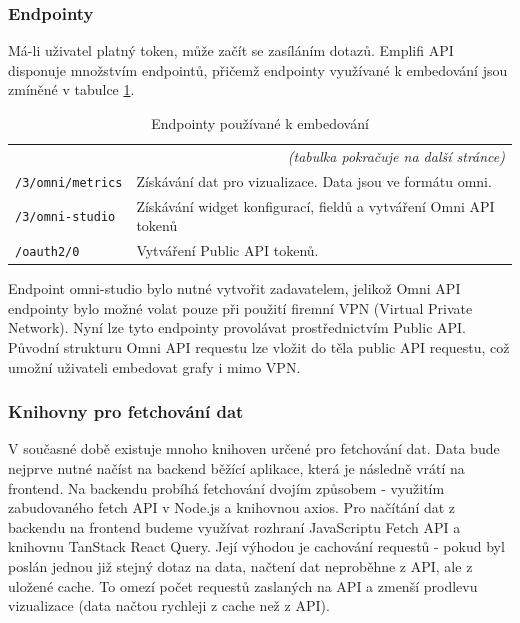 \documentclass[czech, bc, kiv, he, iso690numb]{fasthesis}
\begin{document}
\subsubsection{Endpointy}

Má-li uživatel platný token, může začít se zasíláním dotazů. Emplifi API disponuje množstvím endpointů, přičemž endpointy využívané k embedování jsou zmíněné v tabulce \ref{tab:embeddingEndpoints}. 

\begin{center}
	\begin{longtable}{p{}p{}}
	\caption{Endpointy používané k embedování}
	\label{tab:embeddingEndpoints}\\
	\toprule[1.5pt]
	\endhead
	\midrule
	\multicolumn{2}{r}{\textit{(tabulka pokračuje na další stránce)}}\\
	\endfoot
	\bottomrule[1.5pt]
	\endlastfoot
	\verb"/3/omni/metrics" & Získávání dat pro vizualizace. Data jsou ve formátu omni. \\
	\midrule
	\verb"/3/omni-studio" &  Získávání widget konfigurací, fieldů a vytváření Omni API tokenů\\
	\midrule
	\verb"/oauth2/0" &  Vytváření Public API tokenů. \\
	\end{longtable}
\end{center}

Endpoint omni-studio bylo nutné vytvořit zadavatelem, jelikož Omni API endpointy bylo možné volat pouze při použití firemní VPN (Virtual Private Network). Nyní lze tyto endpointy provolávat prostřednictvím Public API. Původní
strukturu Omni API requestu lze vložit do těla public API requestu, což umožní uživateli embedovat grafy i mimo VPN.

\subsubsection{Knihovny pro fetchování dat}

V současné době existuje mnoho knihoven určené pro fetchování dat. Data bude nejprve nutné načíst na backend běžící aplikace, která je následně vrátí na frontend. Na backendu probíhá fetchování dvojím způsobem - 
využitím zabudovaného fetch API v Node.js a knihovnou axios. Pro načítání dat z backendu na frontend budeme využívat rozhraní JavaScriptu Fetch API a knihovnu TanStack React Query. Její výhodou je cachování
requestů \cite{tanstackQueryDocs} - pokud byl poslán jednou již stejný dotaz na data, načtení dat neproběhne z API, ale z uložené cache. To omezí počet requestů zaslaných na API a zmenší prodlevu vizualizace (data načtou rychleji z cache než z API). 
\end{document}
